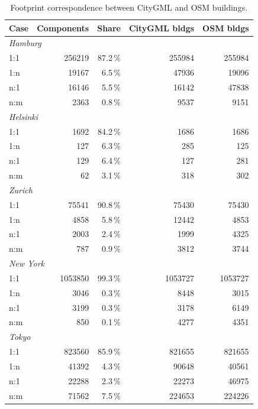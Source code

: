 \documentclass[sigconf,authordraft]{acmart}
\begin{document}
\begin{table}[h!]
  \caption{
  Footprint correspondence between CityGML and OSM buildings.
  }
  \label{tab:footprint_cases}
  \begin{tabular}{lrrrr}
    \toprule
    Case & Components & Share & CityGML bldgs & OSM bldgs \\
    \midrule
    \multicolumn{5}{l}{\emph{Hamburg}} \\
    1:1 & \num{256219} & 87.2\,\% & \num{255984} & \num{255984} \\
    1:n & \num{19167} & 6.5\,\% & \num{47936} & \num{19096} \\
    n:1 & \num{16146} & 5.5\,\% & \num{16142} & \num{47838} \\
    n:m & \num{2363} & 0.8\,\% & \num{9537} & \num{9151} \\
    \midrule
    \multicolumn{5}{l}{\emph{Helsinki}} \\
    1:1 & \num{1692} & 84.2\,\% & \num{1686} & \num{1686} \\
    1:n & \num{127} & 6.3\,\% & \num{285} & \num{125} \\
    n:1 & \num{129} & 6.4\,\% & \num{127} & \num{281} \\
    n:m & \num{62} & 3.1\,\% & \num{318} & \num{302} \\
    \midrule
    \multicolumn{5}{l}{\emph{Zurich}} \\
    1:1 & \num{75541} & 90.8\,\% & \num{75430} & \num{75430} \\
    1:n & \num{4858} & 5.8\,\% & \num{12442} & \num{4853} \\
    n:1 & \num{2003} & 2.4\,\% & \num{1999} & \num{4325} \\
    n:m & \num{787} & 0.9\,\% & \num{3812} & \num{3744} \\
    \midrule
    \multicolumn{5}{l}{\emph{New York}} \\
    1:1 & \num{1053850} & 99.3\,\% & \num{1053727} & \num{1053727} \\
    1:n & \num{3046} & 0.3\,\% & \num{8448} & \num{3015} \\
    n:1 & \num{3199} & 0.3\,\% & \num{3178} & \num{6149} \\
    n:m & \num{850} & 0.1\,\% & \num{4277} & \num{4351} \\
    \midrule
    \multicolumn{5}{l}{\emph{Tokyo}} \\
    1:1 & \num{823560} & 85.9\,\% & \num{821655} & \num{821655} \\
    1:n & \num{41392} & 4.3\,\% & \num{90648} & \num{40561} \\
    n:1 & \num{22288} & 2.3\,\% & \num{22273} & \num{46975} \\
    n:m & \num{71562} & 7.5\,\% & \num{224653} & \num{224226} \\
    \bottomrule
  \end{tabular}


\end{table}
\end{document}
